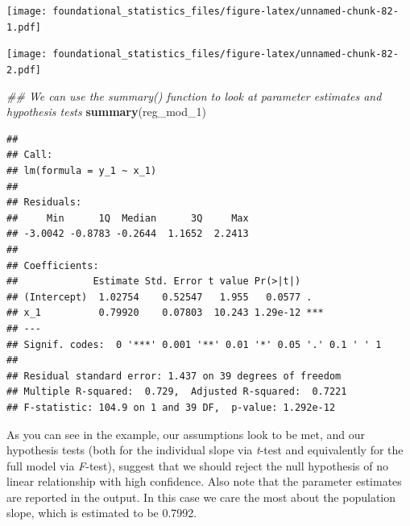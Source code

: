 \documentclass[]{book}
\newenvironment{Shaded}{\begin{snugshade}}{\end{snugshade}}
\newcommand{\CommentTok}[1]{\textcolor[rgb]{0.56,0.35,0.01}{\textit{#1}}}
\newcommand{\DataTypeTok}[1]{\textcolor[rgb]{0.13,0.29,0.53}{#1}}
\newcommand{\DecValTok}[1]{\textcolor[rgb]{0.00,0.00,0.81}{#1}}
\newcommand{\KeywordTok}[1]{\textcolor[rgb]{0.13,0.29,0.53}{\textbf{#1}}}
\newcommand{\NormalTok}[1]{#1}
\newcommand{\OperatorTok}[1]{\textcolor[rgb]{0.81,0.36,0.00}{\textbf{#1}}}
\newcommand{\StringTok}[1]{\textcolor[rgb]{0.31,0.60,0.02}{#1}}
\begin{document}
\texttt{[image: foundational\_statistics\_files/figure-latex/unnamed-chunk-82-1.pdf]}

\begin{Shaded}
\end{Shaded}

\texttt{[image: foundational\_statistics\_files/figure-latex/unnamed-chunk-82-2.pdf]}

\begin{Shaded}
\begin{Highlighting}[]
\CommentTok{## We can use the summary() function to look at parameter estimates and hypothesis tests}
\KeywordTok{summary}\NormalTok{(reg_mod_}\DecValTok{1}\NormalTok{)}
\end{Highlighting}
\end{Shaded}

\begin{verbatim}
## 
## Call:
## lm(formula = y_1 ~ x_1)
## 
## Residuals:
##     Min      1Q  Median      3Q     Max 
## -3.0042 -0.8783 -0.2644  1.1652  2.2413 
## 
## Coefficients:
##             Estimate Std. Error t value Pr(>|t|)    
## (Intercept)  1.02754    0.52547   1.955   0.0577 .  
## x_1          0.79920    0.07803  10.243 1.29e-12 ***
## ---
## Signif. codes:  0 '***' 0.001 '**' 0.01 '*' 0.05 '.' 0.1 ' ' 1
## 
## Residual standard error: 1.437 on 39 degrees of freedom
## Multiple R-squared:  0.729,  Adjusted R-squared:  0.7221 
## F-statistic: 104.9 on 1 and 39 DF,  p-value: 1.292e-12
\end{verbatim}

As you can see in the example, our assumptions look to be met, and our hypothesis tests (both for the individual slope via \emph{t}-test and equivalently for the full model via \emph{F}-test), suggest that we should reject the null hypothesis of no linear relationship with high confidence. Also note that the parameter estimates are reported in the output. In this case we care the most about the population slope, which is estimated to be 0.7992.
\end{document}

